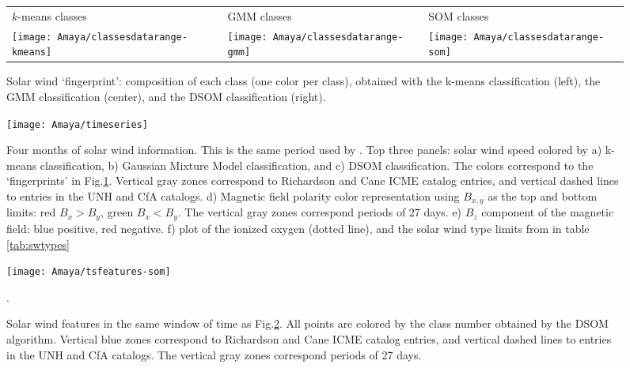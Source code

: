 \documentclass[utf8]{frontiersSCNS} %
\begin{document}
\begin{figure}[h!]\centering
	\begin{tabular}{CCC}
		$k$-means classes & GMM classes & SOM classes \\
		\texttt{[image: Amaya/classesdatarange-kmeans]} &
		\texttt{[image: Amaya/classesdatarange-gmm]} &
		\texttt{[image: Amaya/classesdatarange-som]} \hfill \\
	\end{tabular}
	\caption{Solar wind `fingerprint': composition of each class (one color per class), obtained with the k-means classification (left), the GMM classification (center), and the DSOM classification (right).}\label{fig:classesdatarange}
\end{figure}

\begin{figure}[h!]
	\begin{center}
		\texttt{[image: Amaya/timeseries]}%
	\end{center}
	\caption{Four months of solar wind information. This is the same period used by \citep{Roberts2020}. Top three panels: solar wind speed colored by a) k-means classification, b) Gaussian Mixture Model classification, and c) DSOM classification. The colors correspond to the `fingerprints' in Fig.\ref{fig:classesdatarange}. Vertical gray zones correspond to Richardson and Cane ICME catalog entries, and vertical dashed lines to entries in the UNH and CfA catalogs. d) Magnetic field polarity color representation using $B_{x,y}$ as the top and bottom limits: red $B_x>B_y$, green $B_x<B_y$. The vertical gray zones correspond periods of 27 days. e) $B_z$ component of the magnetic field: blue positive, red negative. f) plot of the ionized oxygen (dotted line), and the solar wind type limits from \citep{Zhao2009} in table \ref{tab:swtypes}}\label{fig:timeseries}
\end{figure}

\begin{figure}[h!]
	\begin{center}
		\texttt{[image: Amaya/tsfeatures-som]}%
	\end{center}
	\caption{Solar wind features in the same window of time as Fig.\ref{fig:timeseries}. All points are colored by the class number obtained by the DSOM algorithm. Vertical blue zones correspond to Richardson and Cane ICME catalog entries, and vertical dashed lines to entries in the UNH and CfA catalogs. The vertical gray zones correspond periods of 27 days.}\label{fig:tsfeatures-som}.
\end{figure}
\end{document}
